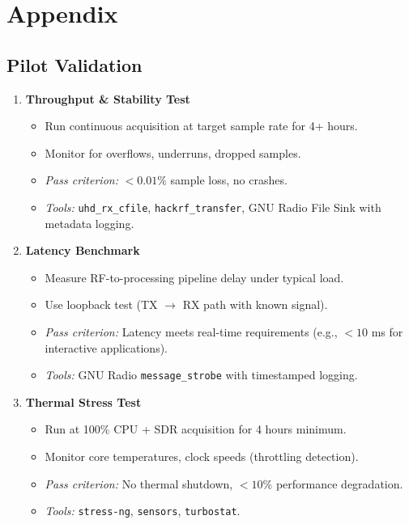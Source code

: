 \documentclass[11pt,a4paper]{article}
\begin{document}
\clearpage
\appendix

\section*{Appendix}

\subsection*{Pilot Validation}

\begin{enumerate}
  \item \textbf{Throughput \& Stability Test}
  \begin{itemize}
    \item Run continuous acquisition at target sample rate for 4+ hours.
    \item Monitor for overflows, underruns, dropped samples.
    \item \textit{Pass criterion:} $<0.01\%$ sample loss, no crashes.
    \item \textit{Tools:} \texttt{uhd\_rx\_cfile}, \texttt{hackrf\_transfer}, GNU Radio File Sink with metadata logging.
  \end{itemize}

  \item \textbf{Latency Benchmark}
  \begin{itemize}
    \item Measure RF-to-processing pipeline delay under typical load.
    \item Use loopback test (TX $\rightarrow$ RX path with known signal).
    \item \textit{Pass criterion:} Latency meets real-time requirements (e.g., $<10$ ms for interactive applications).
    \item \textit{Tools:} GNU Radio \texttt{message\_strobe} with timestamped logging.
  \end{itemize}

  \item \textbf{Thermal Stress Test}
  \begin{itemize}
    \item Run at 100\% CPU + SDR acquisition for 4 hours minimum.
    \item Monitor core temperatures, clock speeds (throttling detection).
    \item \textit{Pass criterion:} No thermal shutdown, $<10\%$ performance degradation.
    \item \textit{Tools:} \texttt{stress-ng}, \texttt{sensors}, \texttt{turbostat}.
  \end{itemize}


\end{enumerate}
\end{document}
